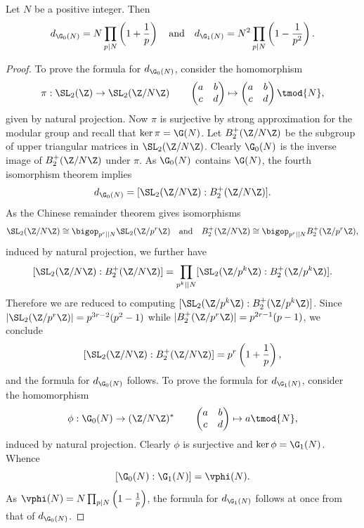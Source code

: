\documentclass[12pt]{article}
\begin{document}
        \begin{proposition}\label{prop:Hecke_congruence_index_computations}
          Let \(N\) be a positive integer. Then
          \[
            d_{\G_{0}(N)} = N\prod_{p \mid N}\left(1+\frac{1}{p}\right) \quad \text{and} \quad d_{\G_{1}(N)} = N^{2}\prod_{p \mid N}\left(1-\frac{1}{p^{2}}\right).
          \]
        \end{proposition}
        \begin{proof}
          To prove the formula for \(d_{\G_{0}(N)}\), consider the homomorphism
          \[
            \pi:\SL_{2}(\Z) \to \SL_{2}(\Z/N\Z) \qquad \begin{pmatrix} a & b \\ c & d \end{pmatrix} \mapsto \begin{pmatrix} a & b \\ c & d \end{pmatrix} \tmod{N},
          \]
          given by natural projection. Now \(\pi\) is surjective by strong approximation for the modular group and recall that \(\ker\pi = \G(N)\). Let \(B_{2}^{+}(\Z/N\Z)\) be the subgroup of upper triangular matrices in \(\SL_{2}(\Z/N\Z)\). Clearly \(\G_{0}(N)\) is the inverse image of \(B_{2}^{+}(\Z/N\Z)\) under \(\pi\). As \(\G_{0}(N)\) contains \(\G(N)\), the fourth isomorphism theorem implies
          \[
            d_{\G_{0}(N)} = [\SL_{2}(\Z/N\Z):B_{2}^{+}(\Z/N\Z)].
          \]
          As the Chinese remainder theorem gives isomorphisms
          \[
            \SL_{2}(\Z/N\Z) \cong \bigop_{p^{r} \mid\mid N}\SL_{2}(\Z/p^{r}\Z) \quad \text{and} \quad B_{2}^{+}(\Z/N\Z) \cong \bigop_{p^{r} \mid\mid N}B_{2}^{+}(\Z/p^{r}\Z),
          \]
          induced by natural projection, we further have
          \[
            [\SL_{2}(\Z/N\Z):B_{2}^{+}(\Z/N\Z)] = \prod_{p^{k} \mid\mid N}[\SL_{2}(\Z/p^{k}\Z):B_{2}^{+}(\Z/p^{k}\Z)].
          \]
          Therefore we are reduced to computing \([\SL_{2}(\Z/p^{k}\Z):B_{2}^{+}(\Z/p^{k}\Z)]\). Since \(|\SL_{2}(\Z/p^{r}\Z)| = p^{3r-2}(p^{2}-1)\) while \(|B_{2}^{+}(\Z/p^{r}\Z)| = p^{2r-1}(p-1)\), we conclude
          \[
            [\SL_{2}(\Z/N\Z):B_{2}^{+}(\Z/N\Z)] = p^{r}\left(1+\frac{1}{p}\right),
          \]
          and the formula for \(d_{\G_{0}(N)}\) follows. To prove the formula for \(d_{\G_{1}(N)}\), consider the homomorphism
          \[
            \phi:\G_{0}(N) \to (\Z/N\Z)^{\ast} \qquad \begin{pmatrix} a & b \\ c & d \end{pmatrix} \mapsto a \tmod{N},
          \]
          induced by natural projection. Clearly \(\phi\) is surjective and \(\ker\phi = \G_{1}(N)\). Whence
          \[
            [\G_{0}(N):\G_{1}(N)] = \vphi(N).
          \]
          As \(\vphi(N) = N\prod_{p \mid N}\left(1-\frac{1}{p}\right)\), the formula for \(d_{\G_{1}(N)}\) follows at once from that of \(d_{\G_{0}(N)}\).
        \end{proof}
\end{document}
